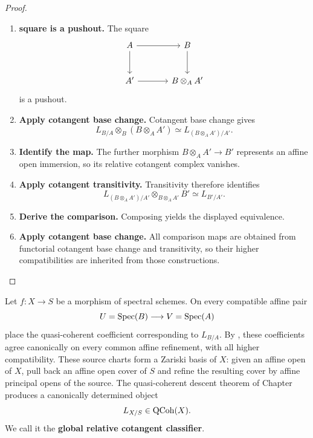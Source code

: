 \begin{proof}
\leavevmode
\begin{enumerate}[label=\textup{(\arabic*)}]
    \item \textbf{square is a pushout.}
    The square
    \[
    \begin{tikzcd}[column sep=large,row sep=large]
        A \arrow[r] \arrow[d]
            & B \arrow[d]
        \\
        A' \arrow[r]
            & B\otimes_AA'
    \end{tikzcd}
    \]
    is a pushout.

    \item \textbf{Apply cotangent base change.}
    Cotangent base change gives
    \[
        L_{B/A}\otimes_B(B\otimes_AA')
        \simeq
        L_{(B\otimes_AA')/A'}.
    \]

    \item \textbf{Identify the map.}
    The further morphism \(
B\otimes_AA'\to B'
\) represents an affine open immersion, so its relative
    cotangent complex vanishes.

    \item \textbf{Apply cotangent transitivity.}
    Transitivity therefore identifies
    \[
        L_{(B\otimes_AA')/A'}\otimes_{B\otimes_AA'}B'
        \simeq
        L_{B'/A'}.
    \]

    \item \textbf{Derive the comparison.}
    Composing yields the displayed equivalence.

    \item \textbf{Apply cotangent base change.}
    All comparison maps are obtained from functorial cotangent base change and transitivity, so
    their higher compatibilities are inherited from those constructions.
\end{enumerate}
\end{proof}

\begin{construction}
\label{con:native-global-cotangent-classifier}
Let \(f:X\to S\) be a morphism of spectral schemes. On every compatible
affine pair
\[
    U=\operatorname{Spec}(B)\longrightarrow V=\operatorname{Spec}(A)
\]
place the quasi-coherent coefficient corresponding to \(L_{B/A}\). By
, these coefficients agree
canonically on every common affine refinement, with all higher compatibility.
These source charts form a Zariski basis of \(X\): given an affine open of
\(X\), pull back an affine open cover of \(S\) and refine the resulting
cover by affine principal opens of the source. The quasi-coherent descent
theorem of
Chapter~ produces a canonically
determined object
\[
    L_{X/S}\in\operatorname{QCoh}(X).
\]
We call it the \textbf{global relative cotangent classifier}.
\end{construction}

